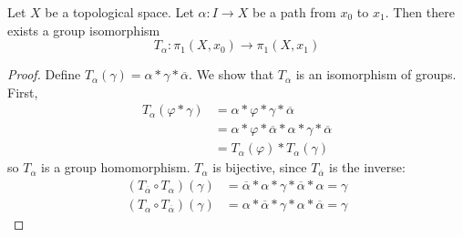 \begin{theorem}
    Let \( X \) be a topological space.
    Let \( \alpha: I \to X \) be a path
    from \( x_0 \) to \( x_1 \).
    Then there exists a group isomorphism
    \[
      T_\alpha: \pi_1(X, x_0) \to \pi_1(X, x_1)
    \]
\end{theorem}

\begin{center}
\end{center}

\begin{proof}
  Define \( T_\alpha (\gamma) = \alpha * \gamma * \overline{\alpha} \).
  We show that \( T_\alpha \) is an isomorphism of groups.
  First,
  \begin{align*}
    T_\alpha(\varphi * \gamma) &= \alpha * \varphi * \gamma * \overline{\alpha} \\
                               &= \alpha * \varphi * \overline{\alpha} * \alpha * \gamma * \overline{\alpha} \\
                               &= T_\alpha(\varphi) * T_\alpha(\gamma)
  \end{align*}
  so \( T_\alpha \) is a group homomorphism.
  \( T_\alpha \) is bijective, since \( T_{\overline{\alpha}} \)
  is the inverse:
  \begin{align*}
    (T_{\overline{\alpha}} \circ T_{\alpha}) (\gamma)
      &= \overline{\alpha} * \alpha * \gamma * \overline{\alpha} * \alpha = \gamma \\
      (T_{\alpha} \circ T_{\overline{\alpha}}) (\gamma)
      &= \alpha * \overline{\alpha} * \gamma * \alpha * \overline{\alpha} = \gamma
  \end{align*}
\end{proof}
